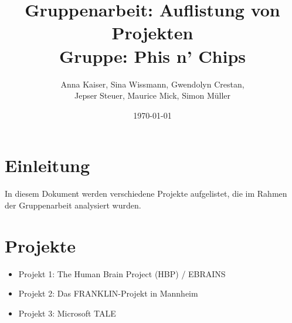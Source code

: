 \documentclass{article}
\title{
    \vspace*{5cm}
    Gruppenarbeit: Auflistung von Projekten \\ Gruppe: Phis n' Chips}
\author{Anna Kaiser, Sina Wissmann, Gwendolyn Crestan, \\ Jepser Steuer, Maurice Mick, Simon Müller}
\date{\today}
\begin{document}
\maketitle
\clearpage %
\section{Einleitung}
In diesem Dokument werden verschiedene Projekte aufgelistet, die im Rahmen der Gruppenarbeit analysiert wurden.

\section{Projekte}
\begin{itemize}
    \item Projekt 1: The Human Brain Project (HBP) / EBRAINS
    \item Projekt 2: Das FRANKLIN-Projekt in Mannheim
    \item Projekt 3: Microsoft TALE
\end{itemize}

\clearpage

\end{document}

